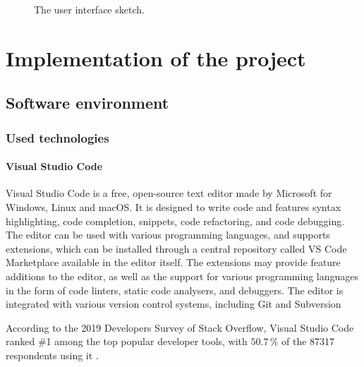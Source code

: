 \documentclass[english,bachelors,forcepolishlogotype]{wizthesis}
\newcommand{\todo}[1]{%
  \textcolor{red}{[\textbf{TODO}\ifx&#1&{}\else{ }\fi\emph{#1}]}%
}
\begin{document}
\begin{figure}[H]
  \centering
  \caption{The user interface sketch.}
  \label{fig:interface-prototype}
\end{figure}

\chapter{Implementation of the project} \label{ch:implementation-of-the-project}

\section{Software environment}

\subsection{Used technologies} \label{sbs:used-technologies}

\subsubsection*{Visual Studio Code}

Visual Studio Code \cite{vs-code} is a free, open-source text editor made by
Microsoft for Windows, Linux and macOS. It is designed to write code and
features syntax highlighting, code completion, snippets, code refactoring, and
code debugging. The editor can be used with various programming languages, and
supports extensions, which can be installed through a central repository called
VS Code Marketplace available in the editor itself. The extensions may provide
feature additions to the editor, as well as the support for various programming
languages in the form of code linters, static code analysers, and debuggers. The
editor is integrated with various version control systems, including Git and
Subversion

According to the 2019 Developers Survey of Stack Overflow, Visual Studio Code
ranked \#1 among the top popular developer tools, with $50.7\,\%$ of the 87317
respondents using it \cite{stack-overflow-insights-2019}.
\end{document}
